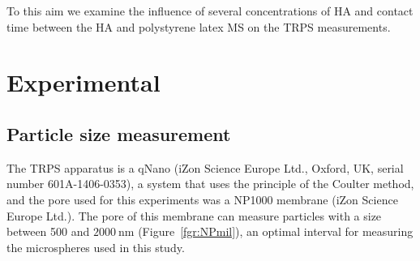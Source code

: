 \documentclass[journal=langd5,manuscript=article]{achemso}
\begin{document}
To this aim we examine the influence of several concentrations of HA and contact time between the HA and polystyrene latex MS on the TRPS measurements.





\section{Experimental} %
\subsection{Particle size measurement}
The TRPS apparatus is a qNano (iZon Science Europe Ltd., Oxford, UK, serial number 601A-1406-0353), a system that uses the principle of the Coulter method, and the pore used for this experiments was a NP1000 membrane (iZon Science Europe Ltd.). The pore of this membrane can measure particles with a size between 500 and $2000~\mathrm{nm}$ (Figure~\ref{fgr:NPmil}), an optimal interval for measuring the microspheres used in this study.
\end{document}
